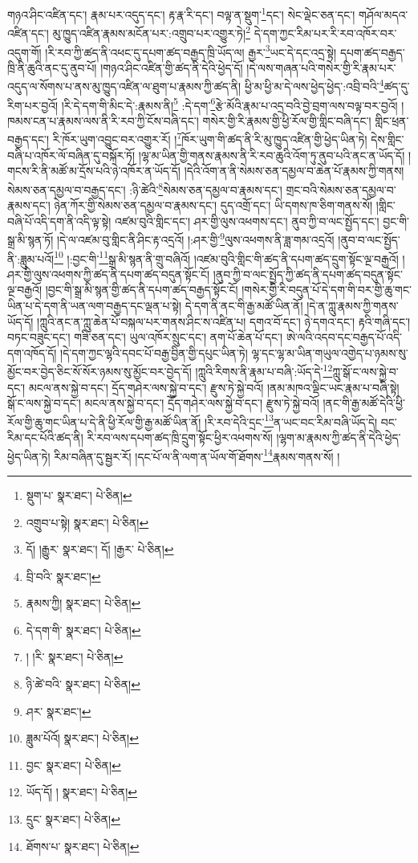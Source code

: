 གཉའ་ཤིང་འཛིན་དང་། རྣམ་པར་འདུད་དང་། རྟ་རྣ་རི་དང་། བལྟ་ན་སྡུག་\footnote{སྡུག་པ་  སྣར་ཐང་།  པེ་ཅིན། }དང་། སེང་ལྡེང་ཅན་དང་། གཤོལ་མདའ་འཛིན་དང་། མུ་ཁྱུད་འཛིན་རྣམས་མངོན་པར་:འགྲུབ་པར་འགྱུར་ཏེ།\footnote{འགྲུབ་པ་སྟེ།  སྣར་ཐང་།  པེ་ཅིན། } དེ་དག་ཀྱང་རིམ་པར་རི་རབ་འཁོར་བར་འདུག་གོ། །རི་རབ་ཀྱི་ཚད་ནི་འཕང་དུ་དཔག་ཚད་བརྒྱད་ཁྲི་ཡོད་ལ། རྒྱར་\footnote{དོ། །རྒྱུར་  སྣར་ཐང་། དོ། །རྒྱར་  པེ་ཅིན། }ཡང་དེ་དང་འདྲ་སྟེ། དཔག་ཚད་བརྒྱད་ཁྲི་ནི་ཆུའི་ནང་དུ་ནུབ་པོ། །གཉའ་ཤིང་འཛིན་གྱི་ཚད་ནི་དེའི་ཕྱེད་དོ། །དེ་ལས་གཞན་པའི་གསེར་གྱི་རི་རྣམ་པར་འདུད་ལ་སོགས་པ་ནས་མུ་ཁྱུད་འཛིན་ལ་ཐུག་པ་རྣམས་ཀྱི་ཚད་ནི། ཕྱི་མ་ཕྱི་མ་དེ་ལས་ཕྱེད་ཕྱེད་:འབྲི་བའི་\footnote{བྲི་བའི་  སྣར་ཐང་། }ཚད་དུ་རིག་པར་བྱའོ། །རི་དེ་དག་གི་མིང་དེ་:རྣམས་ནི།\footnote{རྣམས་ཀྱི།  སྣར་ཐང་།  པེ་ཅིན། } :དེ་དག་\footnote{དེ་དག་གི་  སྣར་ཐང་།  པེ་ཅིན། }རྩེ་མོའི་རྣམ་པ་འདྲ་བའི་བྱེ་བྲག་ལས་བལྟ་བར་བྱའོ། །ཁམས་ངན་པ་རྣམས་ལས་ནི་རི་རབ་ཀྱི་ངོས་བཞི་དང་། གསེར་གྱི་རི་རྣམས་གྱི་ཕྱི་རོལ་གྱི་གླིང་བཞི་དང་། གླིང་ཕྲན་བརྒྱད་དང་། རི་ཁོར་ཡུག་འབྱུང་བར་འགྱུར་རོ། །\footnote{། །རི་  སྣར་ཐང་།  པེ་ཅིན། }ཁོར་ཡུག་གི་ཚད་ནི་རི་མུ་ཁྱུད་འཛིན་གྱི་ཕྱེད་ཡིན་ཏེ། དེས་གླིང་བཞི་པ་འཁོར་ལོ་བཞིན་དུ་བསྐོར་ཏོ། །ལྷ་མ་ཡིན་གྱི་གནས་རྣམས་ནི་རི་རབ་ཆུའི་འོག་ཏུ་ནུབ་པའི་ནང་ན་ཡོད་དོ། །གངས་རི་ནི་མཚོ་མ་དྲོས་པའི་ཉེ་འཁོར་ན་ཡོད་དོ། །དེའི་འོག་ན་ནི་སེམས་ཅན་དམྱལ་བ་ཆེན་པོ་རྣམས་ཀྱི་གནས། སེམས་ཅན་དམྱལ་བ་བརྒྱད་དང་། :ཉི་ཚེའི་\footnote{ཉི་ཚེ་བའི་  སྣར་ཐང་།  པེ་ཅིན། }སེམས་ཅན་དམྱལ་བ་རྣམས་དང་། གྲང་བའི་སེམས་ཅན་དམྱལ་བ་རྣམས་དང་། ཉེན་ཀོར་གྱི་སེམས་ཅན་དམྱལ་བ་རྣམས་དང་། དུད་འགྲོ་དང་། ཡི་དགས་ཁ་ཅིག་གནས་སོ། །གླིང་བཞི་པོ་འདི་དག་ནི་འདི་ལྟ་སྟེ། འཛམ་བུའི་གླིང་དང་། ཤར་གྱི་ལུས་འཕགས་དང་། ནུབ་ཀྱི་བ་ལང་སྤྱོད་དང་། བྱང་གི་སྒྲ་མི་སྙན་ཏོ། །དེ་ལ་འཛམ་བུ་གླིང་ནི་ཤིང་རྟ་འདྲའོ། །:ཤར་གྱི་\footnote{ཤར་  སྣར་ཐང་། }ལུས་འཕགས་ནི་ཟླ་གམ་འདྲའོ། །ནུབ་བ་ལང་སྤྱོད་ནི་:ཟླུམ་པའོ།\footnote{ཟླུམ་པོའོ།  སྣར་ཐང་།  པེ་ཅིན། } །:བྱང་གི་\footnote{བྱང་  སྣར་ཐང་།  པེ་ཅིན། }སྒྲ་མི་སྙན་ནི་གྲུ་བཞིའོ། །འཛམ་བུའི་གླིང་གི་ཚད་ནི་དཔག་ཚད་དྲུག་སྟོང་ལྔ་བརྒྱའོ། །ཤར་གྱི་ལུས་འཕགས་ཀྱི་ཚད་ནི་དཔག་ཚད་བདུན་སྟོང་ངོ། །ནུབ་ཀྱི་བ་ལང་སྤྱོད་ཀྱི་ཚད་ནི་དཔག་ཚད་བདུན་སྟོང་ལྔ་བརྒྱའོ། །བྱང་གི་སྒྲ་མི་སྙན་གྱི་ཚད་ནི་དཔག་ཚད་བརྒྱད་སྟོང་ངོ། །གསེར་གྱི་རི་བདུན་པོ་དེ་དག་གི་བར་གྱི་ཆུ་གང་ཡིན་པ་དེ་དག་ནི་ཡན་ལག་བརྒྱད་དང་ལྡན་པ་སྟེ། དེ་དག་ནི་ནང་གི་རྒྱ་མཚོ་ཡིན་ནོ། །དེ་ན་ཀླུ་རྣམས་ཀྱི་གནས་ཡོད་དོ། །ཀླུའི་ནང་ན་ཀླུ་ཆེན་པོ་བསྐལ་པར་གནས་ཤིང་ས་འཛིན་པ། དགའ་བོ་དང་། ཉེ་དགའ་དང་། རྟའི་གཞི་དང་། བཏང་བཟུང་དང་། གཟི་ཅན་དང་། ཡུལ་འཁོར་སྲུང་དང་། ནག་པོ་ཆེན་པོ་དང་། ཨེ་ལའི་འདབ་དང་བརྒྱད་པོ་འདི་དག་འཁོད་དོ། །དེ་དག་ཀྱང་ལྷའི་དབང་པོ་བརྒྱ་བྱིན་གྱི་དཔུང་ཡིན་ཏེ། ལྷ་དང་ལྷ་མ་ཡིན་གཡུལ་འགྱེད་པ་ཉམས་སུ་མྱོང་བར་བྱེད་ཅིང་སོ་སོར་ཉམས་སུ་མྱོང་བར་བྱེད་དོ། །ཀླུའི་རིགས་ནི་རྣམ་པ་བཞི་:ཡོད་དེ་\footnote{ཡོད་དོ། །  སྣར་ཐང་།  པེ་ཅིན། }ཀླུ་སྒོ་ང་ལས་སྐྱེ་བ་དང་། མངལ་ནས་སྐྱེ་བ་དང་། དྲོད་གཤེར་ལས་སྐྱེ་བ་དང་། རྫུས་ཏེ་སྐྱེ་བའོ། །ནམ་མཁའ་ལྡིང་ཡང་རྣམ་པ་བཞི་སྟེ། སྒོ་ང་ལས་སྐྱེ་བ་དང་། མངལ་ནས་སྐྱེ་བ་དང་། དྲོད་གཤེར་ལས་སྐྱེ་བ་དང་། རྫུས་ཏེ་སྐྱེ་བའོ། །ནང་གི་རྒྱ་མཚོ་དེའི་ཕྱི་རོལ་གྱི་ཆུ་གང་ཡིན་པ་དེ་ནི་ཕྱི་རོལ་གྱི་རྒྱ་མཚོ་ཡིན་ནོ། །རི་རབ་དེའི་དྲང་\footnote{དྲུང་  སྣར་ཐང་།  པེ་ཅིན། }ན་ཡང་བང་རིམ་བཞི་ཡོད་དེ། བང་རིམ་དང་པོའི་ཚད་ནི། རི་རབ་ལས་དཔག་ཚད་ཁྲི་དྲུག་སྟོང་ཕྱིར་འཕགས་སོ། །ལྷག་མ་རྣམས་ཀྱི་ཚད་ནི་དེའི་ཕྱེད་ཕྱེད་ཡིན་ཏེ། རིམ་བཞིན་དུ་སྦྱར་རོ། །དང་པོ་ལ་ནི་ལག་ན་ཡོལ་གོ་ཐོགས་\footnote{ཐོགས་པ་  སྣར་ཐང་།  པེ་ཅིན། }རྣམས་གནས་སོ། །
